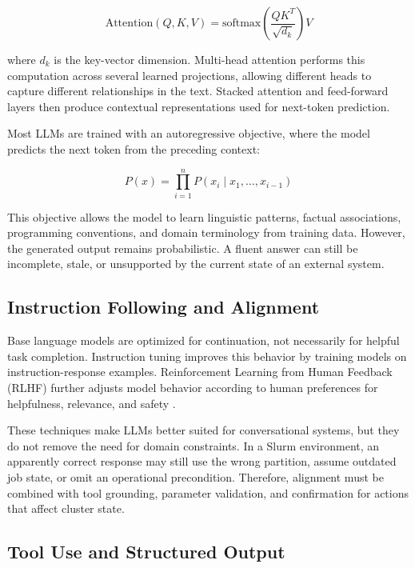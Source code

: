\begin{equation}
    \text{Attention}(Q, K, V) = \text{softmax}\left(\frac{QK^T}{\sqrt{d_k}}\right)V
\end{equation}

where $d_k$ is the key-vector dimension. Multi-head attention performs this computation across several learned projections, allowing different heads to capture different relationships in the text. Stacked attention and feed-forward layers then produce contextual representations used for next-token prediction.

Most LLMs are trained with an autoregressive objective, where the model predicts the next token from the preceding context:

\begin{equation}
    P(x) = \prod_{i=1}^{n} P(x_i \mid x_1, \ldots, x_{i-1})
\end{equation}

This objective allows the model to learn linguistic patterns, factual associations, programming conventions, and domain terminology from training data. However, the generated output remains probabilistic. A fluent answer can still be incomplete, stale, or unsupported by the current state of an external system.

\subsection{Instruction Following and Alignment}

Base language models are optimized for continuation, not necessarily for helpful task completion. Instruction tuning improves this behavior by training models on instruction-response examples. Reinforcement Learning from Human Feedback (RLHF) further adjusts model behavior according to human preferences for helpfulness, relevance, and safety \cite{ouyang2022training}.

These techniques make LLMs better suited for conversational systems, but they do not remove the need for domain constraints. In a Slurm environment, an apparently correct response may still use the wrong partition, assume outdated job state, or omit an operational precondition. Therefore, alignment must be combined with tool grounding, parameter validation, and confirmation for actions that affect cluster state.

\subsection{Tool Use and Structured Output}

